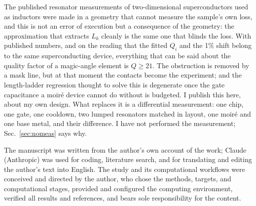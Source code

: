 \documentclass[aps,prb,reprint,superscriptaddress,longbibliography]{revtex4-2}
\begin{document}
The published resonator measurements of two-dimensional superconductors
used as inductors were made in a geometry that cannot measure the
sample's own loss, and this is not an error of execution but a
consequence of the geometry: the approximation that extracts $L_k$
cleanly is the same one that blinds the loss. With published numbers,
and on the reading that the fitted $Q_i$ and the 1\% shift belong to
the same superconducting device, everything that can be said about the
quality factor of a magic-angle element is $Q \geq 21$. The obstruction is removed by a mask line, but
at that moment the contacts become the experiment; and the length-ladder
regression thought to solve this is degenerate once the gate capacitance
a moir\'e device cannot do without is budgeted. I publish this here,
about my own design. What replaces it is a differential measurement: one
chip, one gate, one cooldown, two lumped resonators matched in layout,
one moir\'e and one base metal, and their difference. I have not performed the
measurement; Sec.~\ref{sec:nomeas} says why.

\begin{acknowledgments}
The manuscript was written from the author's own account of the work;
Claude (Anthropic) was used for coding, literature search, and for
translating and editing the author's text into English. The study and its
computational workflows were conceived and directed by the author, who
chose the methods, targets, and computational stages, provided and
configured the computing environment, verified all results and
references, and bears sole responsibility for the content.
\end{acknowledgments}
\end{document}
